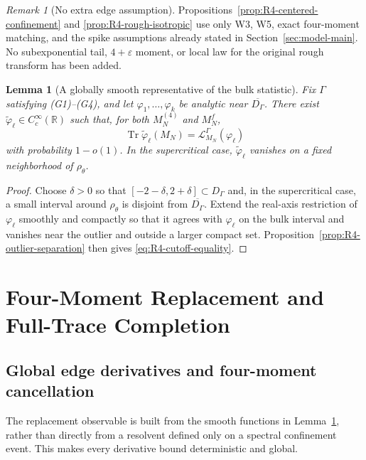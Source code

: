 \documentclass[11pt]{article}
\newtheorem{lemma}[theorem]{Lemma}
\theoremstyle{definition}
\theoremstyle{remark}
\newtheorem{remark}[theorem]{Remark}
\newcommand{\Tr}{\operatorname{Tr}}
\begin{document}
\begin{remark}[No extra edge assumption]
\label{rem:R4-no-extra-edge-assumption}
Propositions~\ref{prop:R4-centered-confinement} and
\ref{prop:R4-rough-isotropic} use only W3, W5, exact four-moment matching, and
the spike assumptions already stated in Section~\ref{sec:model-main}.  No
subexponential tail, \(4+\varepsilon\) moment, or local law for the original
rough transform has been added.
\end{remark}

\begin{lemma}[A globally smooth representative of the bulk statistic]
\label{lem:R4-smooth-cutoff}
Fix \(\Gamma\) satisfying (G1)--(G4), and let
\(\varphi_1,\ldots,\varphi_k\) be analytic near
\(\overline{D_\Gamma}\).  There exist
\(\widetilde\varphi_\ell\in C_c^\infty(\mathbb R)\) such that, for both
\(M_N^{(4)}\) and \(M_N^f\),
\begin{equation}\label{eq:R4-cutoff-equality}
 \Tr\widetilde\varphi_\ell(M_N)
 =\mathcal L_{M_N}^\Gamma(\varphi_\ell)
\end{equation}
with probability \(1-o(1)\).  In the supercritical case,
\(\widetilde\varphi_\ell\) vanishes on a fixed neighborhood of
\(\rho_\theta\).
\end{lemma}

\begin{proof}
Choose \(\delta>0\) so that
\([-2-\delta,2+\delta]\subset D_\Gamma\) and, in the supercritical case, a
small interval around \(\rho_\theta\) is disjoint from
\(\overline{D_\Gamma}\).  Extend the real-axis restriction of \(\varphi_\ell\)
smoothly and compactly so that it agrees with \(\varphi_\ell\) on the bulk
interval and vanishes near the outlier and outside a larger compact set.
Proposition~\ref{prop:R4-outlier-separation} then gives
\eqref{eq:R4-cutoff-equality}.
\end{proof}


\section{Four-Moment Replacement and Full-Trace Completion}
\label{sec:R5-package}

\subsection{Global edge derivatives and four-moment cancellation}

The replacement observable is built from the smooth functions in
Lemma~\ref{lem:R4-smooth-cutoff}, rather than directly from a resolvent
defined only on a spectral confinement event.  This makes every derivative
bound deterministic and global.
\end{document}
